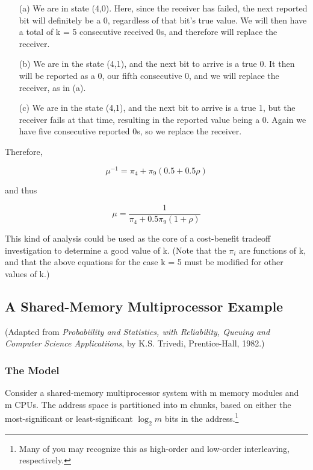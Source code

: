 \documentclass[11pt]{article}
\begin{document}
\begin{itemize}

\item [(a)] We are in state (4,0). Here, since the receiver has failed,
the next reported bit will definitely be a 0, regardless of that bit's
true value. We will then have a total of k = 5 consecutive received 0s,
and therefore will replace the receiver. 

\item [(b)] We are in the state (4,1), and the next bit to arrive is a
true 0. It then will be reported as a 0, our fifth consecutive 0, and we
will replace the receiver, as in (a). 

\item [(c)] We are in the state (4,1), and the next bit to arrive is a
true 1, but the receiver fails at that time, resulting in the reported
value being a 0. Again we have five consecutive reported 0s, so we
replace the receiver. 

\end{itemize}

Therefore,

\begin{equation}
\mu ^{-1}=\pi_{4}+\pi_{9}(0.5+0.5\rho )
\end{equation}


and thus

\begin{equation}
\mu =\frac{1}{\pi_{4}+0.5\pi_{9}(1+\rho )}
\end{equation}

This kind of analysis could be used as the core of a cost-benefit
tradeoff investigation to determine a good value of k. (Note that the
$\pi_{i}$ are functions of k, and that the above equations for the case
k = 5 must be modified for other values of k.)

\subsection{A Shared-Memory Multiprocessor Example}

(Adapted from \textit{Probabiility and Statistics, with Reliability, Queuing
and Computer Science Applicatiions}, by K.S. Trivedi, Prentice-Hall, 1982.)

\subsubsection{The Model}

Consider a shared-memory multiprocessor system with m memory modules and
m CPUs.  The address space is partitioned into m chunks, based on either
the most-significant or least-significant $\log_2m$ bits in the
address.\footnote{Many of you may recognize this as high-order and
low-order interleaving, respectively.} 
\end{document}
